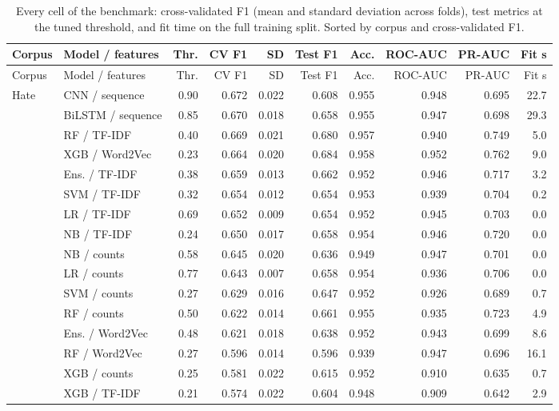 \footnotesize\setlength{\tabcolsep}{4pt}
\begin{longtable}{llrrrrrrrr}
\caption{Every cell of the benchmark: cross-validated F1 (mean and standard deviation across folds), test metrics at the tuned threshold, and fit time on the full training split. Sorted by corpus and cross-validated F1.}\label{tab:full}\\
\toprule
Corpus & Model / features & Thr. & CV F1 & SD & Test F1 & Acc. & ROC-AUC & PR-AUC & Fit s \\
\midrule
\endfirsthead
\toprule
Corpus & Model / features & Thr. & CV F1 & SD & Test F1 & Acc. & ROC-AUC & PR-AUC & Fit s \\
\midrule
\endhead
\bottomrule
\endfoot
Hate & CNN / sequence & 0.90 & 0.672 & 0.022 & 0.608 & 0.955 & 0.948 & 0.695 & 22.7 \\
 & BiLSTM / sequence & 0.85 & 0.670 & 0.018 & 0.658 & 0.955 & 0.947 & 0.698 & 29.3 \\
 & RF / TF-IDF & 0.40 & 0.669 & 0.021 & 0.680 & 0.957 & 0.940 & 0.749 & 5.0 \\
 & XGB / Word2Vec & 0.23 & 0.664 & 0.020 & 0.684 & 0.958 & 0.952 & 0.762 & 9.0 \\
 & Ens. / TF-IDF & 0.38 & 0.659 & 0.013 & 0.662 & 0.952 & 0.946 & 0.717 & 3.2 \\
 & SVM / TF-IDF & 0.32 & 0.654 & 0.012 & 0.654 & 0.953 & 0.939 & 0.704 & 0.2 \\
 & LR / TF-IDF & 0.69 & 0.652 & 0.009 & 0.654 & 0.952 & 0.945 & 0.703 & 0.0 \\
 & NB / TF-IDF & 0.24 & 0.650 & 0.017 & 0.658 & 0.954 & 0.946 & 0.720 & 0.0 \\
 & NB / counts & 0.58 & 0.645 & 0.020 & 0.636 & 0.949 & 0.947 & 0.701 & 0.0 \\
 & LR / counts & 0.77 & 0.643 & 0.007 & 0.658 & 0.954 & 0.936 & 0.706 & 0.0 \\
 & SVM / counts & 0.27 & 0.629 & 0.016 & 0.647 & 0.952 & 0.926 & 0.689 & 0.7 \\
 & RF / counts & 0.50 & 0.622 & 0.014 & 0.661 & 0.955 & 0.935 & 0.723 & 4.9 \\
 & Ens. / Word2Vec & 0.48 & 0.621 & 0.018 & 0.638 & 0.952 & 0.943 & 0.699 & 8.6 \\
 & RF / Word2Vec & 0.27 & 0.596 & 0.014 & 0.596 & 0.939 & 0.947 & 0.696 & 16.1 \\
 & XGB / counts & 0.25 & 0.581 & 0.022 & 0.615 & 0.952 & 0.910 & 0.635 & 0.7 \\
 & XGB / TF-IDF & 0.21 & 0.574 & 0.022 & 0.604 & 0.948 & 0.909 & 0.642 & 2.9 \\

\end{longtable}
